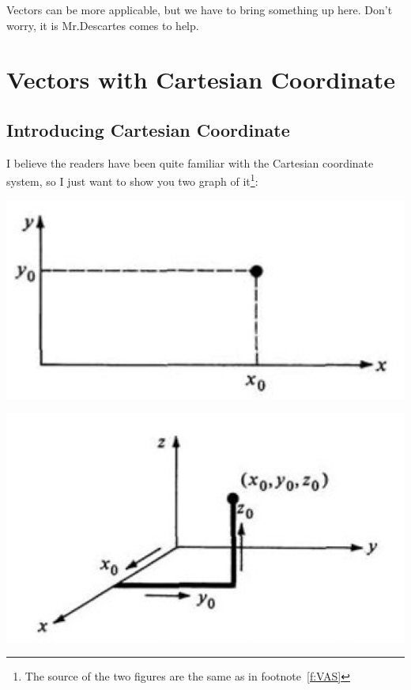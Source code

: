 \documentclass[12pt, a4paper, reqno]{amsart}
\theoremstyle{definition}
\numberwithin{equation}{section} %
\begin{document}
Vectors can be more applicable, but we have to bring something up here. Don't worry, it is Mr.Descartes comes to help.

\newpage
\section{Vectors with Cartesian Coordinate}\label{S:VCC}

\subsection{Introducing Cartesian Coordinate}\label{SS:ICC}\hfill

I believe the readers have been quite familiar with the Cartesian coordinate system, so I just want to show you two graph of it\footnote{The source of the two figures are the same as in footnote~\ref{f:VAS}}\label{f:CC}:

\begin{minipage}{.5\textwidth}
	\centering
	\includegraphics[width=.7\linewidth]{10.png}
\end{minipage}%
\begin{minipage}{.5\textwidth}
	\centering
	\includegraphics[width=.7\linewidth]{11.png}
\end{minipage}
\end{document}
